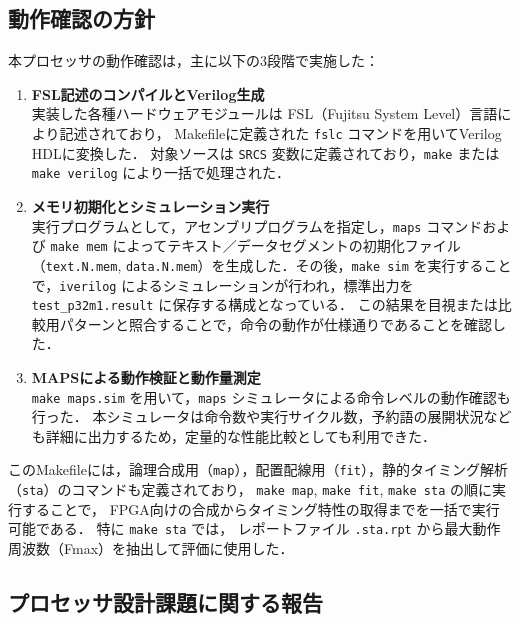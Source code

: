 \documentclass[autodetect-engine,dvi=dvipdfmx,ja=standard,
               a4j,11pt]{bxjsarticle}
\begin{document}
\subsection{動作確認の方針}
本プロセッサの動作確認は，主に以下の3段階で実施した：

\begin{enumerate}
  \item \textbf{FSL記述のコンパイルとVerilog生成} \\
  実装した各種ハードウェアモジュールは FSL（Fujitsu System Level）言語により記述されており，
  Makefileに定義された \texttt{fslc} コマンドを用いてVerilog HDLに変換した．
  対象ソースは \texttt{SRCS} 変数に定義されており，\texttt{make} または
   \texttt{make verilog} により一括で処理された．

  \item \textbf{メモリ初期化とシミュレーション実行} \\
  実行プログラムとして，アセンブリプログラムを指定し，\texttt{maps} コマンドおよび
   \texttt{make mem} によってテキスト／データセグメントの初期化ファイル（\texttt{text.N.mem},
    \texttt{data.N.mem}）を生成した．その後，\texttt{make sim} を実行することで，\texttt{iverilog} 
    によるシミュレーションが行われ，標準出力を \texttt{test\_p32m1.result} に保存する構成となっている．
    この結果を目視または比較用パターンと照合することで，命令の動作が仕様通りであることを確認した．

  \item \textbf{MAPSによる動作検証と動作量測定} \\
  \texttt{make maps.sim} を用いて，\texttt{maps} シミュレータによる命令レベルの動作確認も行った．
  本シミュレータは命令数や実行サイクル数，予約語の展開状況なども詳細に出力するため，定量的な性能比較としても利用できた．
\end{enumerate}

このMakefileには，論理合成用（\texttt{map}），配置配線用（\texttt{fit}），静的タイミング解析（\texttt{sta}）のコマンドも定義されており，
\texttt{make map}, \texttt{make fit}, \texttt{make sta} の順に実行することで，
FPGA向けの合成からタイミング特性の取得までを一括で実行可能である．
特に \texttt{make sta} では，
レポートファイル \texttt{.sta.rpt} から最大動作周波数（Fmax）を抽出して評価に使用した．

\subsection{プロセッサ設計課題に関する報告}
\end{document}
